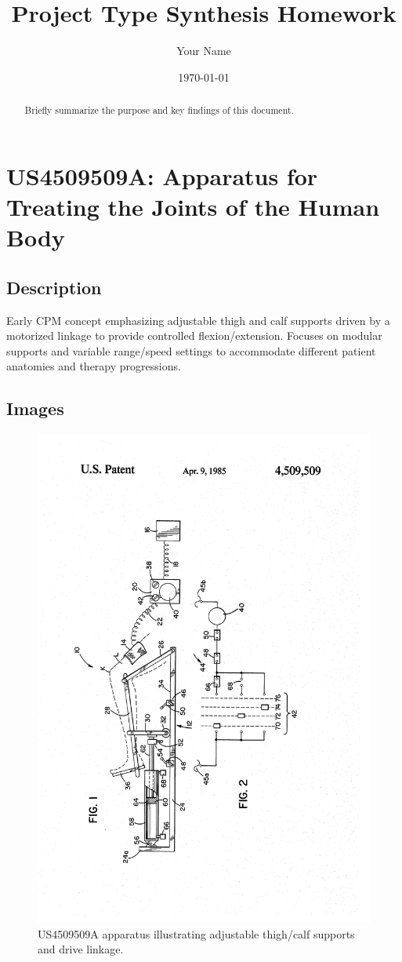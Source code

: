 \documentclass[11pt]{article}
\title{Project Type Synthesis Homework}
\author{Your Name}
\date{\today}
\begin{document}
\maketitle

\begin{abstract}
Briefly summarize the purpose and key findings of this document.
\end{abstract}

\tableofcontents
\newpage

\section{US4509509A: Apparatus for Treating the Joints of the Human Body}
\subsection{Description}
Early CPM concept emphasizing adjustable thigh and calf supports driven by a motorized linkage to provide controlled flexion/extension. Focuses on modular supports and variable range/speed settings to accommodate different patient anatomies and therapy progressions.
\subsection{Images}
\begin{figure}[H]
  \centering
  \includegraphics[width=0.54\linewidth, angle=-90]{US4509509.png}
  \caption{US4509509A apparatus illustrating adjustable thigh/calf supports and drive linkage.}
  \label{fig:US4509509A}
\end{figure}
\end{document}
